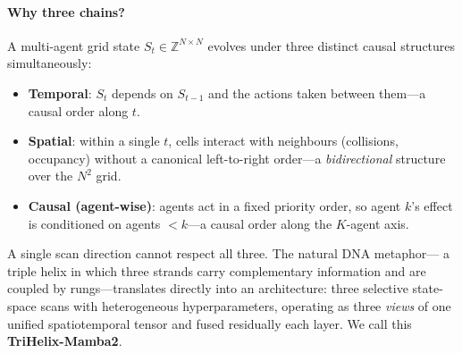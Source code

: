 \paragraph{Why three chains?}
A multi-agent grid state $S_t \in \mathbb{Z}^{N\times N}$ evolves under three
distinct causal structures simultaneously:
\begin{itemize}[leftmargin=*,itemsep=2pt]
  \item \textbf{Temporal}: $S_t$ depends on $S_{t-1}$ and the actions taken
        between them---a causal order along $t$.
  \item \textbf{Spatial}: within a single $t$, cells interact with neighbours
        (collisions, occupancy) without a canonical left-to-right order---a
        \emph{bidirectional} structure over the $N^2$ grid.
  \item \textbf{Causal (agent-wise)}: agents act in a fixed priority order, so
        agent $k$'s effect is conditioned on agents $<k$---a causal order along
        the $K$-agent axis.
\end{itemize}
A single scan direction cannot respect all three. The natural DNA metaphor---
a triple helix in which three strands carry complementary information and are
coupled by rungs---translates directly into an architecture: three selective
state-space scans with heterogeneous hyperparameters, operating as three
\emph{views} of one unified spatiotemporal tensor and fused residually each
layer. We call this \textbf{TriHelix-Mamba2}.

